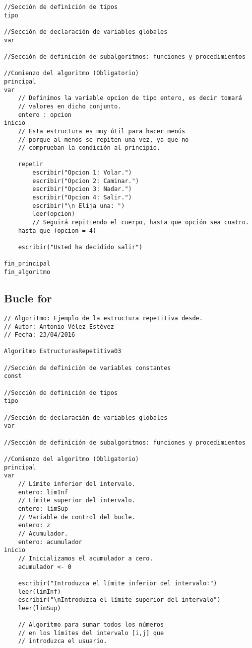 \documentclass{article}
\begin{document}
\begin{appendices}
\begin{lstlisting}[language = pseudocodigoesp]
//Sección de definición de tipos
tipo

//Sección de declaración de variables globales	
var

//Sección de definición de subalgoritmos: funciones y procedimientos	

//Comienzo del algoritmo (Obligatorio)
principal	
var
	// Definimos la variable opcion de tipo entero, es decir tomará
	// valores en dicho conjunto.
	entero : opcion
inicio 	
	// Esta estructura es muy útil para hacer menús
	// porque al menos se repiten una vez, ya que no
	// comprueban la condición al principio.
	
	repetir
		escribir("Opcion 1: Volar.")
		escribir("Opcion 2: Caminar.")
		escribir("Opcion 3: Nadar.")
		escribir("Opcion 4: Salir.")
		escribir("\n Elija una: ")
		leer(opcion)
		// Seguirá repitiendo el cuerpo, hasta que opción sea cuatro.
	hasta_que (opcion = 4)
	
	escribir("Usted ha decidido salir")

fin_principal
fin_algoritmo
  \end{lstlisting}
\subsection{Bucle for}
\begin{lstlisting}[language = pseudocodigoesp]
// Algoritmo: Ejemplo de la estructura repetitiva desde.
// Autor: Antonio Vélez Estévez
// Fecha: 23/04/2016
 
Algoritmo EstructurasRepetitiva03

//Sección de definición de variables constantes
const 
	
//Sección de definición de tipos
tipo

//Sección de declaración de variables globales	
var

//Sección de definición de subalgoritmos: funciones y procedimientos	

//Comienzo del algoritmo (Obligatorio)
principal	
var
	// Límite inferior del intervalo.
	entero: limInf
	// Límite superior del intervalo.
	entero: limSup
	// Variable de control del bucle.
	entero: z
	// Acumulador.
	entero: acumulador
inicio 	
	// Inicializamos el acumulador a cero.
	acumulador <- 0
	
	escribir("Introduzca el límite inferior del intervalo:")
	leer(limInf)
	escribir("\nIntroduzca el límite superior del intervalo")
	leer(limSup)
	
	// Algoritmo para sumar todos los números
	// en los límites del intervalo [i,j] que
	// introduzca el usuario.
	

\end{lstlisting}
\end{appendices}
\end{document}
